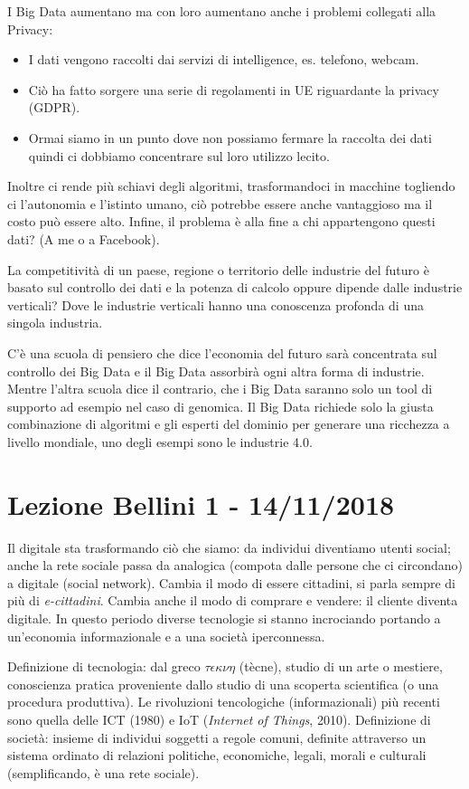 \documentclass[a4page, 11pt]{article}
\begin{document}
I Big Data aumentano ma con loro aumentano anche i problemi collegati alla Privacy:
\begin{itemize}
	\item I dati vengono raccolti dai servizi di intelligence, es. telefono, webcam.
	\item Ciò ha fatto sorgere una serie di regolamenti in UE riguardante la privacy (GDPR).
	\item Ormai siamo in un punto dove non possiamo fermare la raccolta dei dati quindi ci dobbiamo concentrare sul loro utilizzo lecito.
\end{itemize}
Inoltre ci rende più schiavi degli algoritmi, trasformandoci in macchine togliendo ci l’autonomia e l’istinto umano, ciò potrebbe essere anche vantaggioso ma il costo può essere alto. Infine, il problema è alla fine a chi appartengono questi dati? (A me o a Facebook).

La competitività di un paese, regione o territorio delle industrie del futuro è basato sul controllo dei dati e la potenza di calcolo oppure dipende dalle industrie verticali? Dove le industrie verticali hanno una conoscenza profonda di una singola industria.
 
C’è una scuola di pensiero che dice l’economia del futuro sarà concentrata sul controllo dei Big Data e il Big Data assorbirà ogni altra forma di industrie. Mentre l’altra scuola dice il contrario, che i Big Data saranno solo un tool di supporto ad esempio nel caso di genomica. Il Big Data richiede solo la giusta combinazione di algoritmi e gli esperti del dominio per generare una ricchezza a livello mondiale, uno degli esempi sono le industrie 4.0.

\section*{Lezione Bellini 1 - 14/11/2018}
Il digitale sta trasformando ciò che siamo: da individui diventiamo utenti social; anche la rete sociale passa da analogica (compota dalle persone che ci circondano) a digitale (social network).
Cambia il modo di essere cittadini, si parla sempre di più di \textit{e-cittadini}.
Cambia anche il modo di comprare e vendere: il cliente diventa digitale.
In questo periodo diverse tecnologie si stanno incrociando portando a un'economia informazionale e a una società iperconnessa.

Definizione di tecnologia: dal greco $\tau\epsilon\kappa\nu\eta$ (tècne), studio di un arte o mestiere, conoscienza pratica proveniente dallo studio di una scoperta scientifica (o una procedura produttiva).
Le rivoluzioni tencologiche (informazionali) più recenti sono quella delle ICT (1980) e IoT (\textit{Internet of Things}, 2010). \newline
Definizione di società: insieme di individui soggetti a regole comuni, definite attraverso un sistema ordinato di relazioni politiche, economiche, legali, morali e culturali (semplificando, è una rete sociale).
\end{document}
